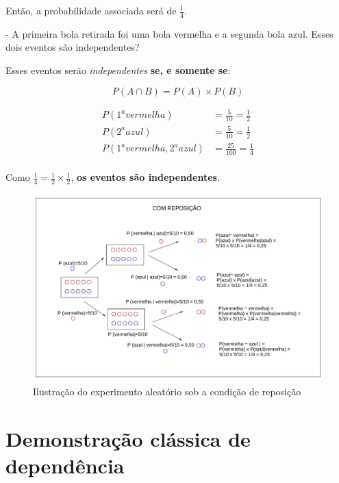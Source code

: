 \documentclass[
]{book}
\begin{document}
\hfill\break

Então, a probabilidade associada será de \(\frac{1}{4}\).

\hfill\break

- A primeira bola retirada foi uma bola vermelha e a segunda bola azul. Esses dois eventos são independentes?

\hfill\break

Esses eventos serão \emph{independentes} \textbf{se, e somente se}:

\hfill\break

\[
P (A \cap B)= P(A) \times P(B)
\]

\hfill\break

\begin{align*}
    P(1^{a} vermelha) & = \frac{5}{10}= \frac{1}{2}\\
    P(2^{a} azul) & = \frac{5}{10}= \frac{1}{2}\\
    P(1^{a} vermelha,2^{a} azul) & = \frac{25}{100} = \frac{1}{4}\\
\end{align*}

\hfill\break

Como \(\frac{1}{4}=\frac{1}{2} \times \frac{1}{2}\), \textbf{os eventos são independentes}.

\hfill\break

\begin{figure}

{\centering \includegraphics[width=0.5\linewidth]{images4/com_rep} 

}

\caption{Ilustração do experimento aleatório sob a condição de reposição}\label{fig:unnamed-chunk-72}
\end{figure}

\hypertarget{demonstrauxe7uxe3o-cluxe1ssica-de-dependuxeancia}{%
\section{Demonstração clássica de dependência}\label{demonstrauxe7uxe3o-cluxe1ssica-de-dependuxeancia}}
\end{document}
